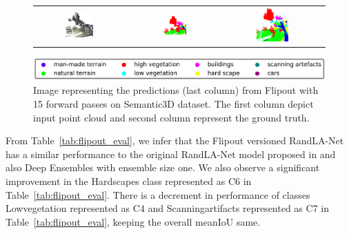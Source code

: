 \begin{figure}[h!]
\begin{tabular}{ccc}
            \includegraphics[width=0.33\textwidth, height=0.18\textheight]{images/seg_output/sem3d_seg_output/3_RGB.pdf} &
            \includegraphics[width=0.33\textwidth, height=0.18\textheight]{images/seg_output/sem3d_seg_output/3_GT.pdf}& 
            \includegraphics[width=0.33\textwidth, height=0.18\textheight]{images/seg_output/flipout/sem3d_3.pdf}\\
        \end{tabular}
        \includegraphics[scale=0.45]{images/legend.png}
        \caption{Image representing the predictions (last column) from Flipout with 15 forward passes on Semantic3D dataset.
        The first column depict input point cloud and second column represent the ground truth.}
        \label{fig:flipout_vis_sem3d}
    \end{figure}   

    From Table~\ref{tab:flipout_eval}, we infer that the Flipout versioned RandLA-Net has a similar performance to the original RandLA-Net model proposed in \cite{Hu_2020_CVPR_Randla} and also Deep Ensembles with ensemble size one.
    We also observe a significant improvement in the Hardscapes class represented as C6 in Table~\ref{tab:flipout_eval}.
    There is a decrement in performance of classes Lowvegetation represented as C4 and Scanningartifacts represented as C7 in Table~\ref{tab:flipout_eval}, keeping the overall meanIoU same.
    
